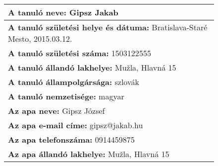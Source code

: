 \documentclass[10pt,a4paper]{article}
\begin{document}
    \begin{figure}[!ht]
    \begin{tabular}{|m{\textwidth}|}
    \hline \vspace{3pt}
    \textbf{A tanuló neve:} \hspace{0.5cm} Gipsz Jakab \vspace{3pt} \\
\hline\vspace{3pt}
\textbf{A tanuló születési helye és dátuma:} \hspace{0.5cm} Bratislava-Staré Mesto, 2015.03.12. \vspace{3pt} \\
\hline\vspace{3pt}
\textbf{A tanuló születési száma:} \hspace{0.5cm} 1503122555 \vspace{3pt} \\
\hline\vspace{3pt}
\textbf{A tanuló állandó lakhelye:} \hspace{0.5cm} Mužla, Hlavná 15 \vspace{3pt} \\
\hline\vspace{3pt}
\textbf{A tanuló állampolgársága:} \hspace{0.5cm} szlovák \vspace{3pt} \\
\hline\vspace{3pt}
\textbf{A tanuló nemzetisége:} \hspace{0.5cm} magyar \vspace{3pt} \\
\hline\vspace{3pt}
\textbf{Az apa neve:} \hspace{0.5cm} Gipsz József \vspace{3pt} \\
\hline\vspace{3pt}
\textbf{Az apa e-mail címe:} \hspace{0.5cm} gipsz@jakab.hu \vspace{3pt} \\
\hline\vspace{3pt}
\textbf{Az apa telefonszáma:} \hspace{0.5cm} 0914459875 \vspace{3pt} \\
\hline\vspace{3pt}
\textbf{Az apa állandó lakhelye:} \hspace{0.5cm} Mužla, Hlavná 15 \vspace{3pt} \\

\end{tabular}
\end{figure}
\end{document}
